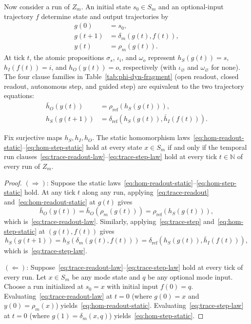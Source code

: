 Now consider a run of $Z_m$. An initial state $s_0\in S_m$ and an optional-input trajectory $f$ determine state and output trajectories by
\begin{align}
  g(0)&=s_0, \label{eq:trace-init}\\
  g(t+1)&=\delta_m(g(t),f(t)),
    \label{eq:trace-step}\\
  y(t)&=\rho_m(g(t)).
    \label{eq:trace-readout}
\end{align}
At tick $t$, the atomic propositions $\sigma_s$, $\iota_i$, and $\omega_o$ represent $h_S(g(t))=s$, $h_I(f(t))=i$, and $h_O(y(t))=o$, respectively (with $\iota_\varnothing$ and $\omega_\varnothing$ for $\mathrm{none}$). The four clause families in Table~\ref{tab:phi-dyn-fragment} (open readout, closed readout, autonomous step, and guided step) are equivalent to the two trajectory equations:
\begin{align}
  \bar h_O(y(t))
    &=\rho_{\mathrm{ref}}(h_S(g(t))), \label{eq:trace-readout-law}\\
  h_S(g(t+1))
    &=\delta_{\mathrm{ref}}(h_S(g(t)),\bar h_I(f(t))).
    \label{eq:trace-step-law}
\end{align}

\begin{lemma}
\label{lem:static-run-bridge}
Fix surjective maps $h_S,h_I,h_O$. The static homomorphism laws~\eqref{eq:hom-readout-static}--\eqref{eq:hom-step-static} hold at every state $x\in S_m$ if and only if the temporal run clauses~\eqref{eq:trace-readout-law}--\eqref{eq:trace-step-law} hold at every tick $t\in\mathbb{N}$ of every run of $Z_m$.
\end{lemma}

\begin{proof}
$(\Rightarrow)$: Suppose the static laws~\eqref{eq:hom-readout-static}--\eqref{eq:hom-step-static} hold. At any tick $t$ along any run, applying~\eqref{eq:trace-readout} and~\eqref{eq:hom-readout-static} at $g(t)$ gives
\[
  \bar h_O(y(t))
  =\bar h_O(\rho_m(g(t)))
  =\rho_{\mathrm{ref}}(h_S(g(t))),
\]
which is~\eqref{eq:trace-readout-law}. Similarly, applying~\eqref{eq:trace-step} and~\eqref{eq:hom-step-static} at $(g(t),f(t))$ gives
\[
  h_S(g(t+1))
  =h_S(\delta_m(g(t),f(t)))
  =\delta_{\mathrm{ref}}(h_S(g(t)),\bar h_I(f(t))),
\]
which is~\eqref{eq:trace-step-law}.

$(\Leftarrow)$: Suppose~\eqref{eq:trace-readout-law}--\eqref{eq:trace-step-law} hold at every tick of every run. Let $x\in S_m$ be any mode state and $q$ be any optional mode input. Choose a run initialized at $s_0=x$ with initial input $f(0)=q$. Evaluating~\eqref{eq:trace-readout-law} at $t=0$ (where $g(0)=x$ and $y(0)=\rho_m(x)$) yields~\eqref{eq:hom-readout-static}. Evaluating~\eqref{eq:trace-step-law} at $t=0$ (where $g(1)=\delta_m(x,q)$) yields~\eqref{eq:hom-step-static}.
\end{proof}


